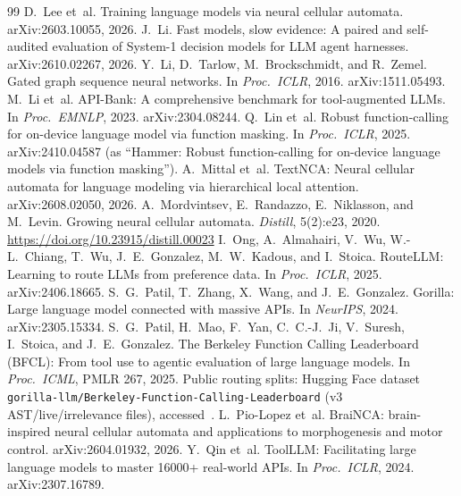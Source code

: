 \documentclass[10pt]{article}
\begin{document}
\begin{thebibliography}{99}
 D.~Lee et~al. Training language models via neural cellular automata. arXiv:2603.10055, 2026.
 J.~Li. Fast models, slow evidence: A paired and self-audited evaluation of System-1 decision models for LLM agent harnesses. arXiv:2610.02267, 2026.
 Y.~Li, D.~Tarlow, M.~Brockschmidt, and R.~Zemel. Gated graph sequence neural networks. In \emph{Proc.\ ICLR}, 2016. arXiv:1511.05493.
 M.~Li et~al. API-Bank: A comprehensive benchmark for tool-augmented LLMs. In \emph{Proc.\ EMNLP}, 2023. arXiv:2304.08244.
 Q.~Lin et~al. Robust function-calling for on-device language model via function masking. In \emph{Proc.\ ICLR}, 2025. arXiv:2410.04587 (as ``Hammer: Robust function-calling for on-device language models via function masking'').
 A.~Mittal et~al. TextNCA: Neural cellular automata for language modeling via hierarchical local attention. arXiv:2608.02050, 2026.
 A.~Mordvintsev, E.~Randazzo, E.~Niklasson, and M.~Levin. Growing neural cellular automata. \emph{Distill}, 5(2):e23, 2020. \url{https://doi.org/10.23915/distill.00023}
 I.~Ong, A.~Almahairi, V.~Wu, W.-L.~Chiang, T.~Wu, J.~E.~Gonzalez, M.~W.~Kadous, and I.~Stoica. RouteLLM: Learning to route LLMs from preference data. In \emph{Proc.\ ICLR}, 2025. arXiv:2406.18665.
 S.~G.~Patil, T.~Zhang, X.~Wang, and J.~E.~Gonzalez. Gorilla: Large language model connected with massive APIs. In \emph{NeurIPS}, 2024. arXiv:2305.15334.
 S.~G.~Patil, H.~Mao, F.~Yan, C.~C.-J.~Ji, V.~Suresh, I.~Stoica, and J.~E.~Gonzalez. The Berkeley Function Calling Leaderboard (BFCL): From tool use to agentic evaluation of large language models. In \emph{Proc.\ ICML}, PMLR 267, 2025. Public routing splits: Hugging Face dataset \texttt{gorilla-llm/Berkeley-Function-Calling-Leaderboard} (v3 AST/live/irrelevance files), accessed~\numHermesDatasetAccess{}.
 L.~Pio-Lopez et~al. BraiNCA: brain-inspired neural cellular automata and applications to morphogenesis and motor control. arXiv:2604.01932, 2026.
 Y.~Qin et~al. ToolLLM: Facilitating large language models to master 16000+ real-world APIs. In \emph{Proc.\ ICLR}, 2024. arXiv:2307.16789.

\end{thebibliography}
\end{document}
